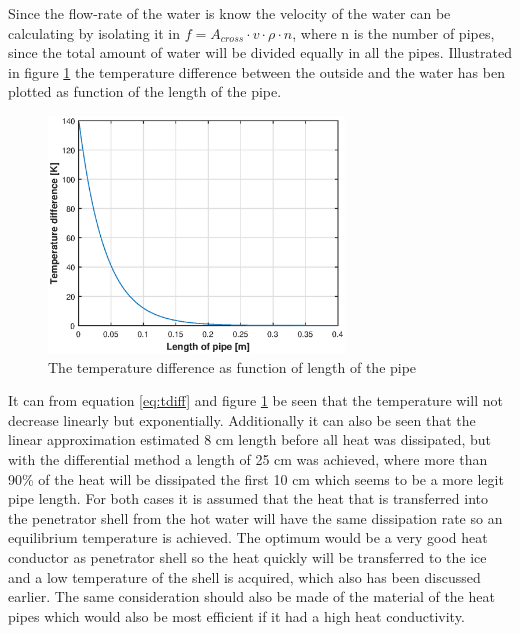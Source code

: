 Since the flow-rate of the water is know the velocity of the water can be calculating by isolating it in $f = A_{cross}\cdot v \cdot \rho \cdot n$, where n is the number of pipes, since the total amount of water will be divided equally in all the pipes. Illustrated in figure \ref{fig:watercool} the temperature difference between the outside and the water has ben plotted as function of the length of the pipe. 
\begin{figure}[htb]
  \centering
  \includegraphics[width=0.7\textwidth]{figures/Ricardo/watercooling.eps}
  \caption{The temperature difference as function of length of the pipe}
  \label{fig:watercool}
\end{figure}
It can from equation \ref{eq:tdiff} and figure \ref{fig:watercool} be seen that the temperature will not decrease linearly but exponentially. Additionally it can also be seen that the linear approximation estimated 8 cm length before all heat was dissipated, but with the differential method a length of 25 cm was achieved, where more than 90\% of the heat will be dissipated the first 10 cm which seems to be a more legit pipe length. For both cases it is assumed that the heat that is transferred into the penetrator shell from the hot water will have the same dissipation rate so an equilibrium temperature is achieved. The optimum would be a very good heat conductor as penetrator shell so the heat quickly will be transferred to the ice and a low temperature of the shell is acquired, which also has been discussed earlier. The same consideration should also be made of the material of the heat pipes which would also be most efficient if it had a high heat conductivity. \\

